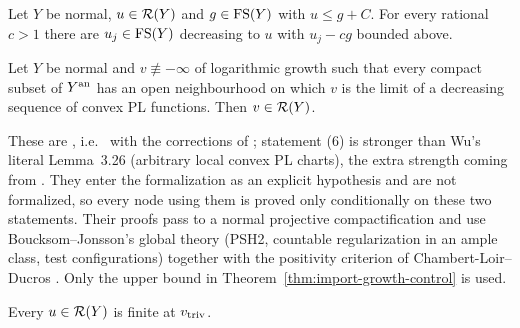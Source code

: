 \begin{theorem}\label{thm:import-growth-control}
\leanok
{}
Let $Y$ be normal, $u\in\mathcal{R}(Y)$ and $g\in\mathrm{FS}(Y)$ with $u\le g+C$. For every rational $c>1$
there are $u_j\in\mathrm{FS}(Y)$ decreasing to $u$ with $u_j-cg$ bounded above.
\end{theorem}

\begin{theorem}\label{thm:import-local-to-global}
\leanok
{}
Let $Y$ be normal and $v\not\equiv-\infty$ of logarithmic growth such that every compact subset
of $Y^{\mathrm{an}}$ has an open neighbourhood on which $v$ is the limit of a decreasing sequence of convex
PL functions. Then $v\in\mathcal{R}(Y)$.
\end{theorem}

\begin{remark}\label{rmk:imports}
These are \cite[Lemma~5.11(5),(6)]{FHX}, i.e.\ \cite[Lemmas~3.25(2), 3.26]{Wu26} with the
corrections of \cite{FHX}; statement (6) is stronger than Wu's literal Lemma~3.26 (arbitrary local
convex PL charts), the extra strength coming from \cite[Lemma~5.5]{FHX}. They enter the formalization
as an explicit hypothesis and are not formalized, so every node using them is proved only
conditionally on these two statements. Their proofs pass to a normal projective compactification
\cite[Lemmas~5.9, 5.10]{FHX} and use Boucksom--Jonsson's global theory \cite{BJ22} (PSH2,
countable regularization in an ample class, test configurations) together with the positivity
criterion of Chambert-Loir--Ducros \cite{CLD12} \cite[Lemma~5.5]{FHX}. Only the upper bound in
Theorem~\ref{thm:import-growth-control} is used.
\end{remark}

\begin{lemma}\label{lem:reg-triv-finite}
\leanok
{}
Every $u\in\mathcal{R}(Y)$ is finite at $v_{\mathrm{triv}}$.
\end{lemma}

